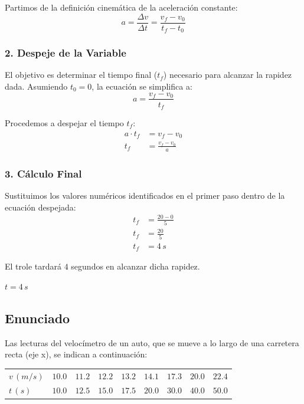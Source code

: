 \documentclass[12pt, a4paper]{article}
\begin{document}
Partimos de la definición cinemática de la aceleración constante:
$$ a = \frac{\Delta v}{\Delta t} = \frac{v_f - v_0}{t_f - t_0} $$

\subsubsection*{2. Despeje de la Variable}
El objetivo es determinar el tiempo final ($t_f$) necesario para alcanzar la rapidez dada. Asumiendo $t_0 = 0$, la ecuación se simplifica a:
$$ a = \frac{v_f - v_0}{t_f} $$

Procedemos a despejar el tiempo $t_f$:
\begin{align*}
    a \cdot t_f &= v_f - v_0 \\
    t_f &= \frac{v_f - v_0}{a}
\end{align*}

\subsubsection*{3. Cálculo Final}
Sustituimos los valores numéricos identificados en el primer paso dentro de la ecuación despejada:
\begin{align*}
    t_f &= \frac{20 - 0}{5} \\
    t_f &= \frac{20}{5} \\
    t_f &= 4 \, \si{s}
\end{align*}

El trole tardará $4$ segundos en alcanzar dicha rapidez.

\begin{tcolorbox}[colback=green!5!white, colframe=green!50!black, title=Respuesta Final]
\centering \Large $t = 4 \, \si{s}$
\end{tcolorbox}

\newpage

\subsection*{Enunciado}
Las lecturas del velocímetro de un auto, que se mueve a lo largo de una carretera recta (eje x), se indican a continuación:

\begin{center}
\renewcommand{\arraystretch}{1.5}
\begin{tabular}{l c c c c c c c c}
$v \, (\si{m/s})$ & $10.0$ & $11.2$ & $12.2$ & $13.2$ & $14.1$ & $17.3$ & $20.0$ & $22.4$ \\
$t \, (\si{s})$   & $10.0$ & $12.5$ & $15.0$ & $17.5$ & $20.0$ & $30.0$ & $40.0$ & $50.0$
\end{tabular}
\end{center}
\end{document}
